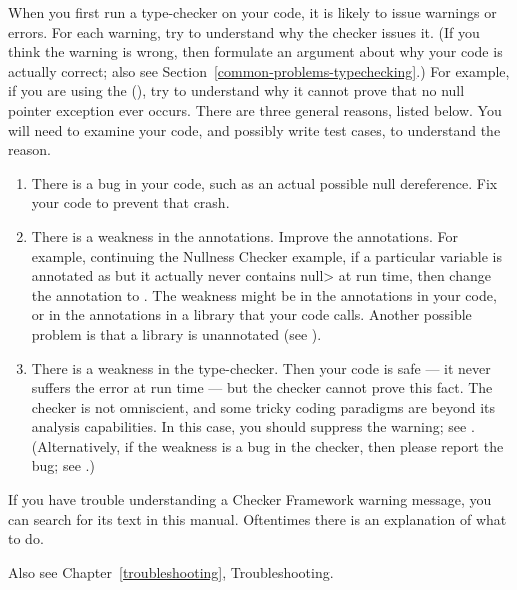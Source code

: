 When you first run a type-checker on your code, it is likely to issue
warnings or errors.  For each warning, try to understand why the checker
issues it.  (If you think the warning is wrong, then formulate an argument
about why your code is actually correct; also see Section~\ref{common-problems-typechecking}.)  For example, if you are using the
(), try to understand why it cannot prove
that no null pointer exception ever occurs.  There are three general
reasons, listed below.  You will need to
examine your code, and possibly write test cases, to understand the reason.

\begin{enumerate}
\item
There is a bug in your code, such as an actual possible null dereference.
Fix your code to prevent that crash.

\item
There is a weakness in the annotations.  Improve the annotations.
For example, continuing the Nullness Checker example, if a particular
variable is annotated as  but it
actually never contains \<null> at run time, then change the annotation to
.  The weakness might be in the
annotations in your code, or in the annotations in a library that your code
calls.  Another possible problem is that a library is unannotated (see
).

\item
There is a weakness in the type-checker.  Then your code is safe --- it never
suffers the error at run time --- but the checker cannot prove this
fact.  The checker is not omniscient, and some
tricky coding paradigms are beyond its analysis capabilities.  In this
case, you should suppress the warning; see
.  (Alternatively, if the weakness is
a bug in the checker, then  please report the bug; see
.)
\end{enumerate}

If you have trouble understanding a Checker Framework warning message, you
can search for its text in this manual.
Oftentimes there is an explanation of what to do.

Also see Chapter~\ref{troubleshooting}, Troubleshooting.


